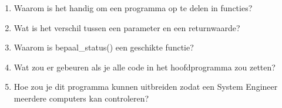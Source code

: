 \begin{enumerate}
\item Waarom is het handig om een programma op te delen in functies?
\item Wat is het verschil tussen een parameter en een returnwaarde?
\item Waarom is bepaal\_status() een geschikte functie?
\item Wat zou er gebeuren als je alle code in het hoofdprogramma zou zetten?
\item Hoe zou je dit programma kunnen uitbreiden zodat een System Engineer meerdere computers kan controleren?
\end{enumerate}

